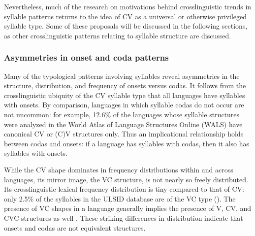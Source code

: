   Nevertheless, much of the research on motivations behind crosslinguistic trends in syllable patterns returns to the idea of CV as a universal or otherwise privileged syllable type. Some of these proposals will be discussed in the following sections, as other crosslinguistic patterns relating to syllable structure are discussed.

\subsubsection{{Asymmetries} {in} {onset} {and} {coda} {patterns}}\label{sec:1.1.2.2}

  Many of the typological patterns involving syllables reveal asymmetries in the structure, distribution, and frequency of onsets versus codas. It follows from the crosslinguistic ubiquity of the CV syllable type that all languages have syllables with onsets. By comparison, languages in which syllable codas do not occur are not uncommon: for example, 12.6\% of the languages whose syllable structures were analyzed in the World Atlas of Language Structures Online (WALS) have canonical CV or (C)V structures only. Thus an implicational relationship holds between codas and onsets: if a language has syllables with codas, then it also has syllables with onsets.

  While the CV shape dominates in frequency distributions within and across languages, its mirror image, the VC structure, is not nearly so freely distributed. Its crosslinguistic lexical frequency distribution is tiny compared to that of CV: only 2.5\% of the syllables in the ULSID database are of the VC type (\citealt{ValléeEtAl2009}). The presence of VC shapes in a language generally implies the presence of V, CV, and CVC structures as well \citep{Blevins1995}. These striking differences in distribution indicate that onsets and codas are not equivalent structures.

